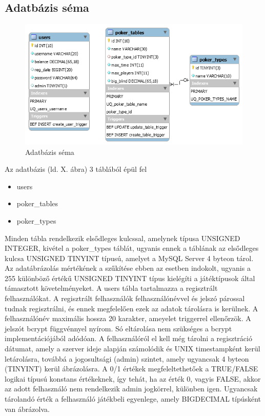 \subsection{Adatbázis séma}
\begin{figure}[h!]
  \caption{Adatbázis séma}
  \centering
    \includegraphics[width=\textwidth]{user-documentation/images/db_scheme.png}
\end{figure}
Az adatbázis (ld. X. ábra) 3 táblából épül fel
\begin{itemize}[leftmargin=2.7cm]
\item users
\item poker\_tables
\item poker\_types
\end{itemize}
 Minden tábla rendelkezik elsődleges kulcssal, amelynek típusa UNSIGNED INTEGER, kivétel a poker\_types táblát, ugyanis ennek a táblának az elsődleges kulcsa UNSIGNED TINYINT típusú, amelyet a MySQL Server 4 byteon tárol. Az adatábrázolás mértékének a szűkítése ebben az esetben indokolt, ugyanis a 255 különböző értékű UNSIGNED TINYINT típus kielégíti a játéktípusok által támasztott követelményeket.  A users tábla tartalmazza a regisztrált felhasználókat. A regisztrált felhasználók felhasználónévvel és jelszó párossal tudnak regisztrálni, és ennek megfelelően ezek az adatok tárolásra is kerülnek. A felhasználónév maximális hossza 20 karakter, ameyelet triggerrel ellenőrzök. A jelszót bcrypt függvénnyel nyírom. Só eltárolása nem szükséges a bcrypt implementációjából adódóan. A felhasználóról el kell még tárolni a regisztráció dátumat, amely a szerver ideje alapján számolódik és UNIX timestampként kerül letárolásra, továbbá a jogosultsági (admin) szintet, amely ugyancsak 4 byteon (TINYINT) kerül ábrázolásra. A 0/1 értékek megfeleltethetőek a TRUE/FALSE logikai típusú konstans értékeknek, így tehát, ha az érték 0, vagyis FALSE, akkor az adott felhasználó nem rendelkezik admin jogkörrel, különben igen. Ugyancsak tárolandó érték a felhasználó játékbeli egyenlege, amely BIGDECIMAL típúsként van ábrázolva.
